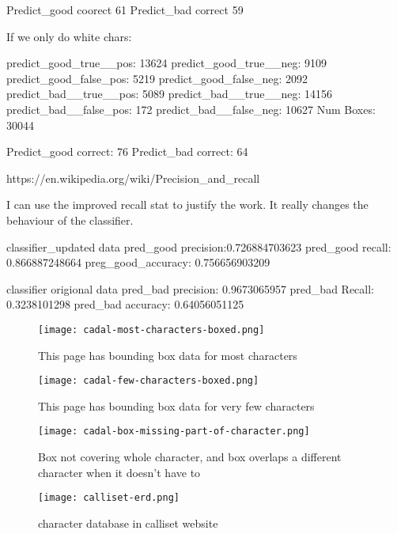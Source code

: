 Predict_good coorect 61%
Predict_bad correct 59%

If we only do white chars:

predict_good_true__pos: 13624
predict_good_true__neg: 9109
predict_good_false_pos: 5219
predict_good_false_neg: 2092
predict_bad__true__pos: 5089
predict_bad__true__neg: 14156
predict_bad__false_pos: 172
predict_bad__false_neg: 10627
Num Boxes: 30044

Predict_good correct: 76%
Predict_bad correct: 64%

https://en.wikipedia.org/wiki/Precision_and_recall

I can use the improved recall stat to justify the work.  It really changes the behaviour of the classifier.

classifier_updated data
pred_good precision:0.726884703623
pred_good recall: 0.866887248664
preg_good_accuracy: 0.756656903209

classifier origional data
pred_bad precision: 0.9673065957
pred_bad Recall: 0.3238101298
pred_bad accuracy: 0.64056051125
    
    \begin{figure}{} %
    \parbox{12cm}{\texttt{[image: cadal-most-characters-boxed.png]}}
    \caption{This page has bounding box data for most characters}
    \label{cadal most characters boxed}
    \end{figure}
    
    \begin{figure}{} %
    \parbox{12cm}{\texttt{[image: cadal-few-characters-boxed.png]}}
    \caption{This page has bounding box data for very few characters}
    \label{cadal less characters boxed}
    \end{figure}
    
    \begin{figure}{}
    \parbox{12cm}{\texttt{[image: cadal-box-missing-part-of-character.png]}}
    \caption{Box not covering whole character, and box overlaps a different character when it doesn't have to}
    \label{cadal single character examples}
    \end{figure}
    
    \begin{figure}{}
    \parbox{12cm}{\texttt{[image: calliset-erd.png]}}
    \caption{character database in calliset website}
    \label{character database in calliset website}
    \end{figure}
    

